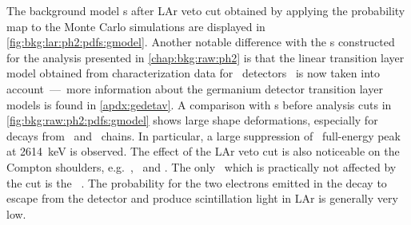 The background model \pdf{}s after LAr veto cut obtained by applying the probability map to
the Monte Carlo simulations are displayed in \cref{fig:bkg:lar:ph2:pdfs:gmodel}. Another
notable difference with the \pdf{}s constructed for the analysis presented in
\cref{chap:bkg:raw:ph2} is that the linear transition layer model obtained from
characterization data for \bege\ detectors~\cite{Lehnert2016} is now taken into
account~---~more information about the germanium detector transition layer models is found in
\cref{apdx:gedetav}. A comparison with \pdf{}s before analysis cuts in
\cref{fig:bkg:raw:ph2:pdfs:gmodel} shows large shape deformations, especially for decays
from \Uh\ and \Thh\ chains. In particular, a large suppression of \Tl\ full-energy peak at
2614~keV is observed. The effect of the LAr veto cut is also noticeable on the Compton
shoulders, e.g.~\kvn, \kvz\ and \Co. The only \pdf\ which is practically not affected by the
cut is the \nnbb\ \pdf. The probability for the two electrons emitted in the decay to
escape from the detector and produce scintillation light in LAr is generally very low.

